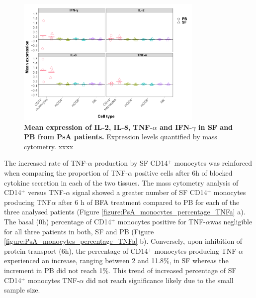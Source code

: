 \begin{figure}[htbp]
\centering
\includegraphics[width=0.8\textwidth]{./Results3/pdfs/CyTOF_ICS_cytokines_production_IL2_IL8_TNF_IFNg}
\caption[Mean expression of IL-2, IL-8, TNF-$\alpha$ and IFN-$\gamma$ in SF and PB from PsA patients.]{\textbf{Mean expression of IL-2, IL-8, TNF-$\alpha$ and IFN-$\gamma$ in SF and PB from PsA patients.} Expression levels quantified by mass cytometry. xxxx }
\label{fig:PSA_cytof_cytokines}
\end{figure}


The increased rate of TNF-$\alpha$ production by SF CD14$^+$ monocytes was reinforced when comparing the proportion of TNF-$\alpha$ positive cells after 6h of blocked cytokine secretion in each of the two tissues. The mass cytometry analysis of CD14$^+$ versus TNF-$\alpha$ signal showed a greater number of SF CD14$^+$ monocytes producing TNF$\alpha$ after 6 h of BFA treatment compared to PB for each of the three analysed patients (Figure \ref{figure:PsA_monocytes_percentage_TNFa} a). The basal (0h) percentage of CD14$^+$ monocytes positive for TNF-$\alpha$was negligible for all three patients in both, SF and PB (Figure \ref{figure:PsA_monocytes_percentage_TNFa} b). Conversely, upon inhibition of protein transport (6h), the percentage of CD14$^+$ monocytes producing TNF-$\alpha$ experienced an increase, ranging between 2 and 11.8\%, in SF whereas the increment in PB did not reach 1\%. This trend of increased percentage of SF CD14$^+$ monocytes TNF-$\alpha$ did not reach significance likely due to the small sample size. 
 
